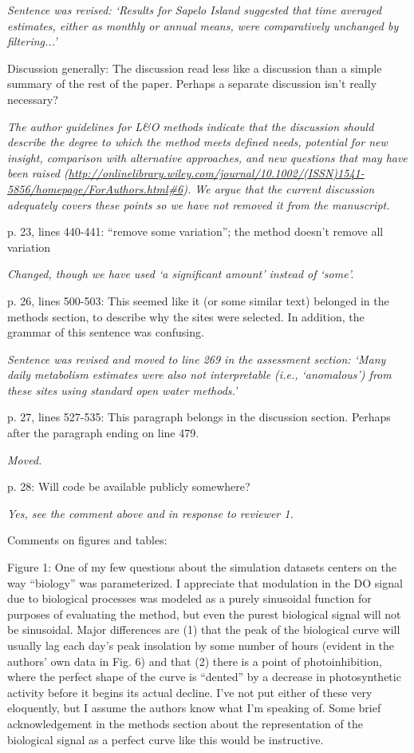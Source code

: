 \documentclass[letterpaper,12pt]{article}\usepackage[]{graphicx}\usepackage[]{color}
\begin{document}
{\it Sentence was revised: `Results for Sapelo Island suggested that time averaged estimates, either as monthly or annual means, were comparatively unchanged by filtering...'}

Discussion generally: The discussion read less like a discussion than a simple summary of the rest of the paper. Perhaps a separate discussion isn’t really necessary?

{\it The author guidelines for L\&O methods indicate that the discussion should describe the degree to which the method meets defined needs, potential for new insight, comparison with alternative approaches, and new questions that may have been raised (\href{http://onlinelibrary.wiley.com/journal/10.1002/(ISSN)1541-5856/homepage/ForAuthors.html#6}{http://onlinelibrary.wiley.com/journal/10.1002/(ISSN)1541-5856/homepage/ForAuthors.html\#6}).  We argue that the current discussion adequately covers these points so we have not removed it from the manuscript. 
}

p. 23, lines 440-441: “remove some variation”; the method doesn’t remove all variation

{\it Changed, though we have used `a significant amount' instead of `some'.}

p. 26, lines 500-503: This seemed like it (or some similar text) belonged in the methods section, to describe why the sites were selected. In addition, the grammar of this sentence was confusing.

{\it Sentence was revised and moved to line 269 in the assessment section: `Many daily metabolism estimates were also not interpretable (i.e., `anomalous') from these sites using standard open water methods.'
}

p. 27, lines 527-535: This paragraph belongs in the discussion section. Perhaps after the paragraph ending on line 479.

{\it Moved.} 

p. 28: Will code be available publicly somewhere?

{\it Yes, see the comment above and in response to reviewer 1.}

Comments on figures and tables:

Figure 1: One of my few questions about the simulation datasets centers on the way “biology” was parameterized. I appreciate that modulation in the DO signal due to biological processes was modeled as a purely sinusoidal function for purposes of evaluating the method, but even the purest biological signal will not be sinusoidal. Major differences are (1) that the peak of the biological curve will usually lag each day’s peak insolation by some number of hours (evident in the authors’ own data in Fig. 6) and that (2) there is a point of photoinhibition, where the perfect shape of the curve is “dented” by a decrease in photosynthetic activity before it begins its actual decline. I’ve not put either of these very eloquently, but I assume the authors know what I’m speaking of. Some brief acknowledgement in the methods section about the representation of the biological signal as a perfect curve like this would be instructive.
\end{document}
